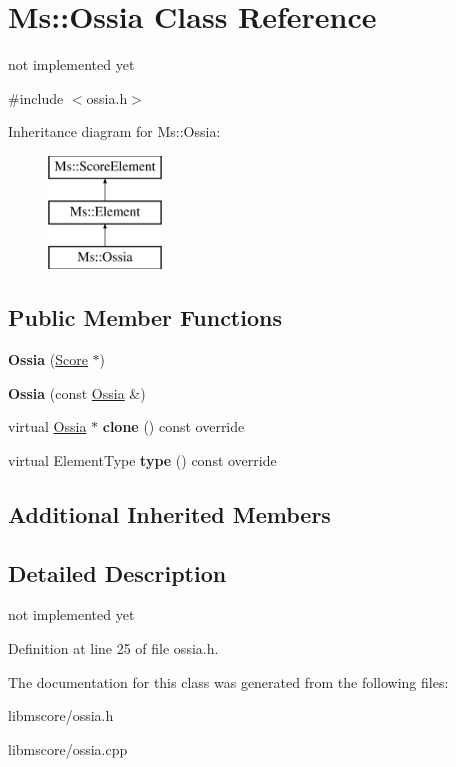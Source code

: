 \hypertarget{class_ms_1_1_ossia}{}\section{Ms\+:\+:Ossia Class Reference}
\label{class_ms_1_1_ossia}


not implemented yet  




{\ttfamily \#include $<$ossia.\+h$>$}

Inheritance diagram for Ms\+:\+:Ossia\+:\begin{figure}[H]
\begin{center}
\leavevmode
\includegraphics[height=3.000000cm]{class_ms_1_1_ossia}
\end{center}
\end{figure}
\subsection*{Public Member Functions}
\begin{DoxyCompactItemize}
\item 
\mbox{\label{class_ms_1_1_ossia_a8b0c54569acae18e4aabb3a43297da8e}} 
{\bfseries Ossia} (\hyperlink{class_ms_1_1_score}{Score} $\ast$)
\item 
\mbox{\label{class_ms_1_1_ossia_afdfc2856f7c171fcbf2c1652c26ae7eb}} 
{\bfseries Ossia} (const \hyperlink{class_ms_1_1_ossia}{Ossia} \&)
\item 
\mbox{\label{class_ms_1_1_ossia_a7ce3b2f018586975d2b9d44f8a77cd8b}} 
virtual \hyperlink{class_ms_1_1_ossia}{Ossia} $\ast$ {\bfseries clone} () const override
\item 
\mbox{\label{class_ms_1_1_ossia_a14c10b0c7089241f54d315cfed90fc9b}} 
virtual Element\+Type {\bfseries type} () const override
\end{DoxyCompactItemize}
\subsection*{Additional Inherited Members}


\subsection{Detailed Description}
not implemented yet 

Definition at line 25 of file ossia.\+h.



The documentation for this class was generated from the following files\+:\begin{DoxyCompactItemize}
\item 
libmscore/ossia.\+h\item 
libmscore/ossia.\+cpp\end{DoxyCompactItemize}
